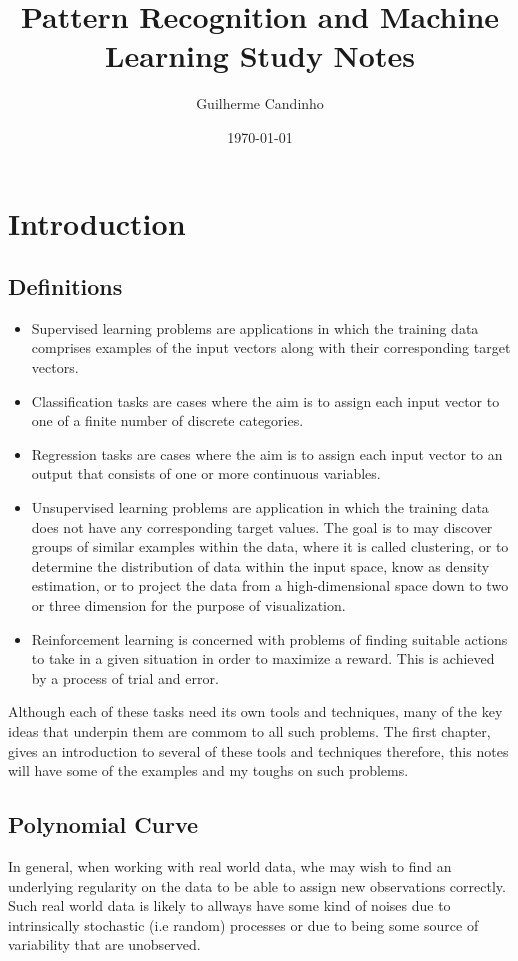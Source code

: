 \documentclass[11pt]{article}
\title{Pattern Recognition and Machine Learning Study Notes}
\author{Guilherme Candinho}
\date{\today}
\begin{document}
\maketitle

\section{Introduction}
\subsection{Definitions}
\begin{itemize}
  \item Supervised learning problems are applications in which the training data comprises examples of the input vectors along with their corresponding target vectors.
  \item Classification tasks are cases where the aim is to assign each input vector to one of a finite number of discrete categories.
  \item Regression tasks are cases where the aim is to assign each input vector to an output that consists of one or more continuous variables.
  \item Unsupervised learning problems are application in which the training data does not have any corresponding target values. The goal is to may discover groups of similar examples within the data, where it is called clustering, or to determine the distribution of data within the input space, know as density estimation, or to project the data from a high-dimensional space down to two or three dimension for the purpose of visualization.
  \item Reinforcement learning is concerned with problems of finding suitable actions to take in a given situation in order to maximize a reward. This is achieved by a process of trial and error.
\end{itemize}
Although each of these tasks need its own tools and techniques, many of the key ideas that underpin them are commom to all such problems. The first chapter, gives an introduction to several of these tools and techniques therefore, this notes will have some of the examples and my toughs on such problems.
\subsection{Polynomial Curve}
In general, when working with real world data, whe may wish to find an underlying regularity on the data to be able to assign new observations correctly. Such real world data is likely to allways have some kind of noises due to intrinsically stochastic (i.e random) processes or due to being some source of variability that are unobserved.
\end{document}
